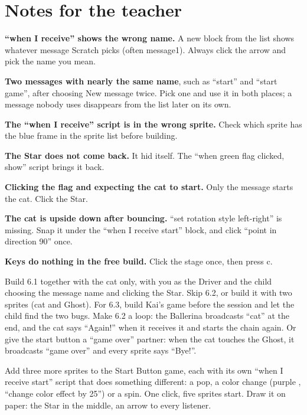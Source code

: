 \section{Notes for the teacher}
\begin{commonmistakes}
  \item \textbf{\enquote{when I receive} shows the wrong name.} A new block from the list shows whatever message Scratch picks (often message1). Always click the arrow and pick the name you mean.
  \item \textbf{Two messages with nearly the same name}, such as \enquote{start} and \enquote{start game}, after choosing New message twice. Pick one and use it in both places; a message nobody uses disappears from the list later on its own.
  \item \textbf{The \enquote{when I receive} script is in the wrong sprite.} Check which sprite has the blue frame in the sprite list before building.
  \item \textbf{The Star does not come back.} It hid itself. The \enquote{when green flag clicked, show} script brings it back.
  \item \textbf{Clicking the flag and expecting the cat to start.} Only the message starts the cat. Click the Star.
  \item \textbf{The cat is upside down after bouncing.} \enquote{set rotation style left-right} is missing. Snap it under the \enquote{when I receive start} block, and click \enquote{point in direction 90} once.
  \item \textbf{Keys do nothing in the free build.} Click the stage once, then press c.
\end{commonmistakes}

\begin{differentiation}
\supportpath Build 6.1 together with the cat only, with you as the Driver and the child choosing the message name and clicking the Star. Skip 6.2, or build it with two sprites (cat and Ghost). For 6.3, build Kai's game before the session and let the child find the two bugs.
\extensionpath Make 6.2 a loop: the Ballerina broadcasts \enquote{cat} at the end, and the cat says \enquote{Again!} when it receives it and starts the chain again. Or give the start button a \enquote{game over} partner: when the cat touches the Ghost, it broadcasts \enquote{game over} and every sprite says \enquote{Bye!}.
\end{differentiation}

\begin{stretchchallenge}
Add three more sprites to the Start Button game, each with its own \enquote{when I receive start} script that does something different: a pop, a color change (purple , \enquote{change color effect by 25}) or a spin. One click, five sprites start. Draw it on paper: the Star in the middle, an arrow to every listener.
\end{stretchchallenge}

